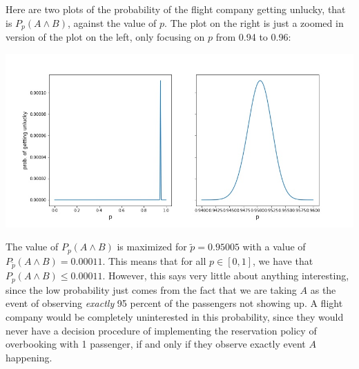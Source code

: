 Here are two plots of the probability of the flight company getting unlucky, that is $P_p(A \land B)$, against the value of $p$. The plot on the right is just a zoomed in version of the plot on the left, only focusing on $p$ from 0.94 to 0.96:
\begin{center}
\includegraphics[scale=0.5]{probability_in_practice/fig1.jpg}
\end{center}
The value of $P_p(A \land B)$ is maximized for $\tilde{p}=0.95005$ with a value of $P_{\tilde{p}}(A \land B)=0.00011$. This means that for all $p \in [0,1]$, we have that $P_p(A \land B) \leq 0.00011$. However, this says very little about anything interesting, since the low probability just comes from the fact that we are taking $A$ as the event of observing \textit{exactly} 95 percent of the passengers not showing up. A flight company would be completely uninterested in this probability, since they would never have a decision procedure of implementing the reservation policy of overbooking with 1 passenger, if and only if they observe exactly event $A$ happening. 

